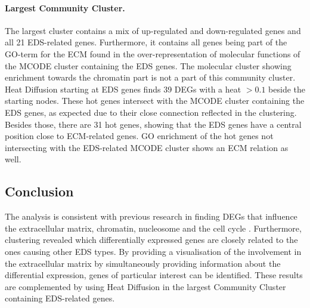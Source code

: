 \paragraph{Largest Community Cluster.} 
The largest cluster contains a mix of up-regulated and down-regulated genes and all 21 EDS-related genes. Furthermore, it contains all  genes being part of the GO-term for the ECM found in the over-representation of molecular functions of the MCODE cluster containing the EDS genes. The molecular cluster showing enrichment towards the chromatin part is not a part of this community cluster. Heat Diffusion starting at EDS genes finds 39 DEGs with a heat $> 0.1$ beside the starting nodes. These hot genes intersect with the MCODE cluster containing the EDS genes, as expected due to their close connection reflected in the clustering. Besides those, there are 31 hot genes, showing that the EDS genes have a central position close to ECM-related genes. GO enrichment of the hot genes not intersecting with the EDS-related MCODE cluster shows an ECM relation as well.

\subsection{Conclusion}

The analysis is consistent with previous research in finding DEGs that influence the extracellular matrix, chromatin, nucleosome and the cell cycle \cite{Chiarelli2018, Ritelli2022}. Furthermore, clustering revealed which differentially expressed genes are closely related to the ones causing other EDS types. By providing a visualisation of the involvement in the extracellular matrix by simultaneously providing information about the differential expression, genes of particular interest can be identified. These results are complemented by using Heat Diffusion in the largest Community Cluster containing EDS-related genes. %

